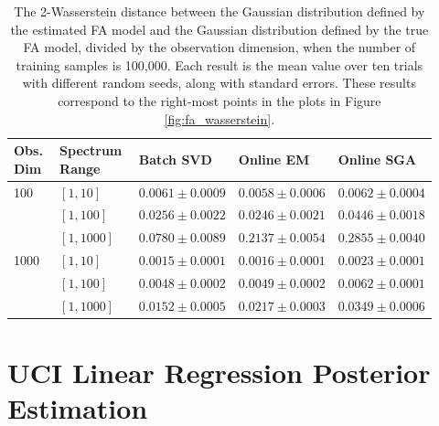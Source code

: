 \documentclass[msc,deptreport.inf]{infthesis} %
\begin{document}
\begin{table}[h!]
	\begin{center}
		\begin{tabular}{|| p{0.12\linewidth} p{0.20\linewidth} p{0.20\linewidth} p{0.20\linewidth} p{0.20\linewidth} ||} 
 			\hline
 			Obs. Dim & Spectrum Range & Batch SVD & Online EM & Online SGA \\ [0.5ex] 
 			\hline\hline
			100 	& $[1, 10]$ 	& $0.0061 \pm 0.0009$ 	& $0.0058 \pm 0.0006$ 	& $0.0062 \pm 0.0004$ \\ 
				& $[1, 100]$ 	& $0.0256 \pm 0.0022$ 	& $0.0246 \pm 0.0021$ 	& $0.0446 \pm 0.0018$ \\ 
				& $[1, 1000]$	& $0.0780 \pm 0.0089$ 	& $0.2137 \pm 0.0054$ 	& $0.2855 \pm 0.0040$ \\ 
			\hline
			1000	& $[1, 10]$ 	& $0.0015 \pm 0.0001$ 	& $0.0016 \pm 0.0001$ 	& $0.0023 \pm 0.0001$ \\ 
				& $[1, 100]$ 	& $0.0048 \pm 0.0002$ 	& $0.0049 \pm 0.0002$ 	& $0.0062 \pm 0.0001$ \\ 
				& $[1, 1000]$ 	& $0.0152 \pm 0.0005$ 	& $0.0217 \pm 0.0003$ 	& $0.0349 \pm 0.0006$ \\ [1ex] 
			\hline
		\end{tabular}
		\caption{The 2-Wasserstein distance between the Gaussian distribution defined by the estimated FA model and the Gaussian distribution defined by the true FA model, divided by the observation dimension, when the number of training samples is 100,000. Each result is the mean value over ten trials with different random seeds, along with standard errors. These results correspond to the right-most points in the plots in Figure \ref{fig:fa_wasserstein}.}
		\label{table:fa_wasserstein}
	\end{center}
\end{table}

\section{UCI Linear Regression Posterior Estimation}\label{app:uci_posterior}
\end{document}

